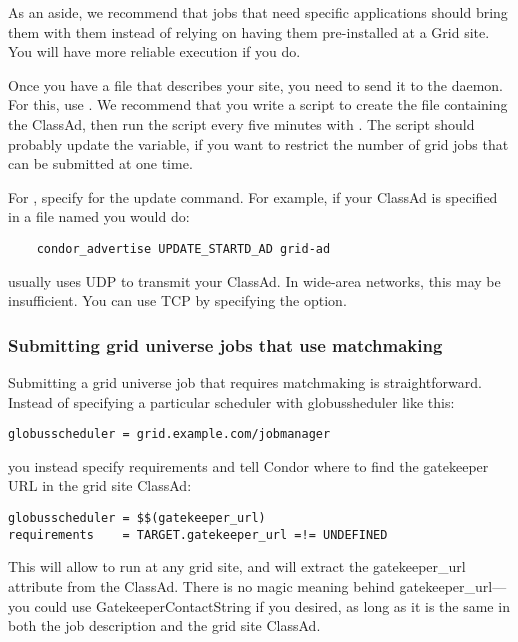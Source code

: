 As an aside, we recommend that jobs that need specific applications
should bring them with them instead of relying on having them
pre-installed at a Grid site. You will have more reliable execution if
you do. 

Once you have a file that describes your site, you need to send it to
the  daemon. For this, use .
We recommend that you write a script to create the file
containing the ClassAd, then run the script every five minutes with
. The script should probably update the 
variable, if you
want to restrict the number of grid jobs that can be submitted at one
time. 

For , specify  for
the update command. For example, if your ClassAd is specified in a
file named  you would do:

\footnotesize
\begin{verbatim}
    condor_advertise UPDATE_STARTD_AD grid-ad
\end{verbatim}
\normalsize

 usually uses UDP to transmit your ClassAd. In
wide-area networks, this may be insufficient. You can use TCP by
specifying the  option. 

\subsubsection{Submitting grid universe jobs that use matchmaking}

Submitting a grid universe job that requires matchmaking is
straightforward. Instead of specifying a particular scheduler with
globussheduler like this:

\footnotesize
\begin{verbatim}
globusscheduler = grid.example.com/jobmanager
\end{verbatim}
\normalsize

you instead specify requirements and tell Condor where to find the
gatekeeper URL in the grid site ClassAd:

\footnotesize
\begin{verbatim}
globusscheduler = $$(gatekeeper_url)
requirements    = TARGET.gatekeeper_url =!= UNDEFINED
\end{verbatim}
\normalsize

This will allow to run at any grid site, and will extract the
gatekeeper\_url attribute from the ClassAd. There is no magic meaning
behind gatekeeper\_url---you could use GatekeeperContactString if you
desired, as long as it is the same in both the job description and the
grid site ClassAd. 

